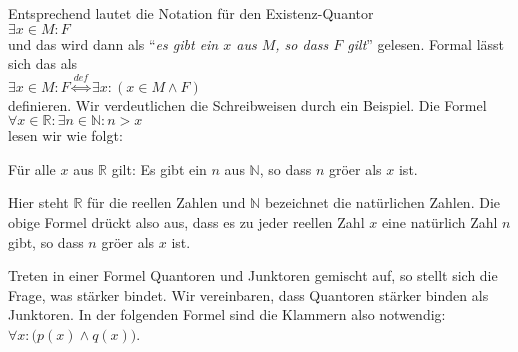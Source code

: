 \begin{enumerate}
      Entsprechend
      lautet die Notation f\"ur den Existenz-Quantor \\[0.2cm]
      \hspace*{1.3cm}  $\exists x \in M: F$ \\[0.2cm]
      und das wird dann  als ``\emph{es gibt ein $x$ aus $M$, so dass $F$ gilt}'' gelesen.  
      Formal l\"asst sich das als \\[0.2cm]
      \hspace*{1.3cm} $\exists x \in M: F \stackrel{de\!f}{\Longleftrightarrow} \exists x\colon (x\in M \wedge F)$ \\[0.2cm]
      definieren.       Wir verdeutlichen die Schreibweisen durch ein Beispiel.  Die Formel \\[0.2cm]
      \hspace*{1.3cm} $\forall x \in \mathbb{R}: \exists n \in \mathbb{N} : n > x$ \\[0.2cm]
      lesen wir wie folgt:
      \begin{center}
        {\em
        \begin{minipage}{12cm}
          F\"ur alle $x$ aus $\mathbb{R}$ gilt: Es gibt ein $n$ aus $\mathbb{N}$, so dass
          $n$ gr\"o\3er als $x$ ist.
        \end{minipage}
        }
      \end{center}
      Hier steht $\mathbb{R}$ f\"ur die reellen Zahlen und $\mathbb{N}$ bezeichnet die nat\"urlichen Zahlen.
      Die obige Formel dr\"uckt also aus, dass es zu jeder reellen Zahl $x$ eine nat\"urlich Zahl $n$ gibt, 
      so dass $n$ gr\"o\3er als $x$ ist.

      Treten in einer Formel Quantoren und Junktoren gemischt auf, so stellt sich die
      Frage, was st\"arker bindet.  Wir vereinbaren, dass Quantoren st\"arker binden als
      Junktoren.  In der folgenden Formel sind die Klammern also notwendig: \\[0.2cm]
      \hspace*{1.3cm} 
      $\forall x \colon \bigl(p(x) \wedge q(x)\bigr)$. 
\end{enumerate}

